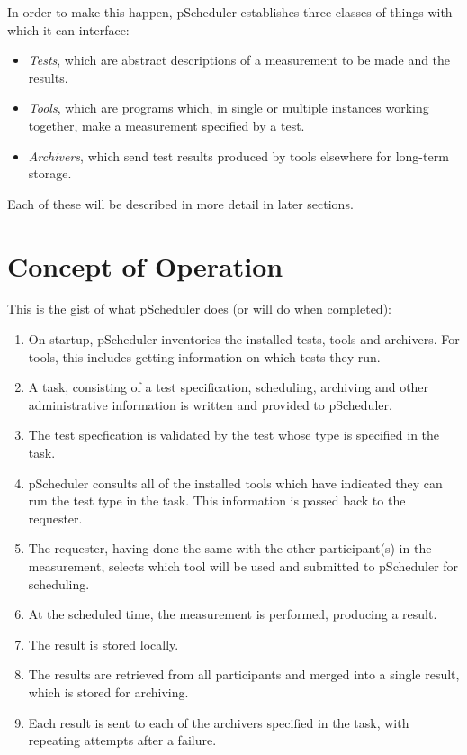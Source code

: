 \documentclass[10pt,titlepage]{article}
\begin{document}
In order to make this happen, pScheduler establishes three classes of
things with which it can interface:

\begin{itemize}
\item {\it Tests}, which are abstract descriptions of a measurement to
  be made and the results.
\item {\it Tools}, which are programs which, in single or multiple
  instances working together, make a measurement specified by a test.
\item {\it Archivers}, which send test results produced by tools
  elsewhere for long-term storage.
\end{itemize}

Each of these will be described in more detail in later sections.

\section{Concept of Operation}


This is the gist of what pScheduler does (or will do when completed):

\begin{enumerate}
\item On startup, pScheduler inventories the installed tests, tools
  and archivers.  For tools, this includes getting information on
  which tests they run.
\item A task, consisting of a test specification, scheduling,
  archiving and other administrative information is written and
  provided to pScheduler.
\item The test specfication is validated by the test whose type is
  specified in the task.
\item pScheduler consults all of the installed tools which have
  indicated they can run the test type in the task.  This information
  is passed back to the requester.
\item The requester, having done the same with the other
  participant(s) in the measurement, selects which tool will be used
  and submitted to pScheduler for scheduling.
\item At the scheduled time, the measurement is performed, producing a
  result.
\item The result is stored locally.
\item The results are retrieved from all participants and merged into
  a single result, which is stored for archiving.
\item Each result is sent to each of the archivers specified in the
  task, with repeating attempts after a failure.
\end{enumerate}
\end{document}
